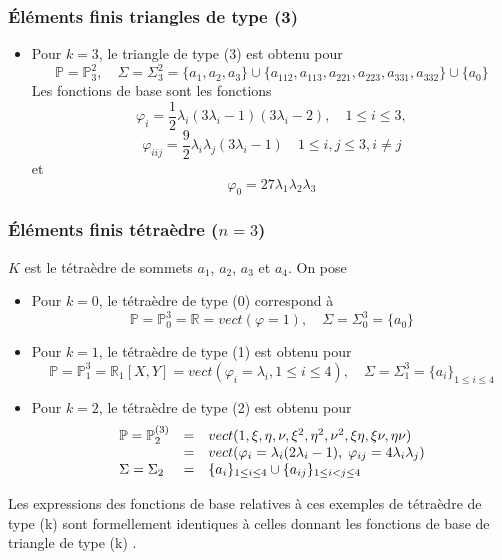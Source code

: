 \documentclass{beamer}
\begin{document}
\begin{frame}
\frametitle{Éléments finis triangles de type (3)}
\begin{itemize}


\item  Pour $k=3$, le triangle de type (3) est obtenu pour
 \[\mathbb{P}=\mathbb{P}_3^2,\quad \Sigma=\Sigma_3^2 = \{a_1,a_2,a_3\}\cup \{a_{112},a_{113},a_{221},a_{223},a_{331},a_{332}\}\cup \{a_{0}\}\]
Les fonctions de base sont les fonctions
\[\varphi_i=\frac 12\lambda_i(3\lambda_i-1)(3\lambda_i-2), \quad 1\leq  i  \leq 3,\] 
\[\varphi_{iij}=\frac 92\lambda_i\lambda_j(3\lambda_i-1) \quad 1\leq  i,j  \leq 3, i\neq j\]
et
  \[\varphi_0 = 27\lambda_1\lambda_2\lambda_3\]
\end{itemize}
\begin{center}
 \end{center}

\end{frame}
\begin{frame}
\frametitle{Éléments finis tétraèdre ($n=3$)}
$K$ est le tétraèdre de sommets $a_1$, $a_2$, $a_3$ et $a_4$. On pose
\begin{itemize}
\item Pour $k=0$, le tétraèdre de type (0) correspond à
\[ \mathbb{P} = \mathbb{P}_0^3=\mathbb{R}=vect(\varphi=1), \quad \Sigma=\Sigma_0^3 = \{a_0\}\]
\item  Pour $k = 1$, le tétraèdre de type (1) est obtenu pour
\[\mathbb{P}=\mathbb{P}_1^3=\mathbb{R}_1[X,Y]=vect(\varphi_i=\lambda_i,1\leq i\leq 4),\quad \Sigma=\Sigma_1^3 = \{a_i\}_{1\leq i\leq 4}\]
\item   Pour $k=2$, le tétraèdre de type (2) est obtenu pour
\[\begin{array}{l  cl}
\mathbb{P}=\mathbb{P}_2^{(3)}&=&vect(1,\xi,\eta,\nu,\xi^2,\eta^2,\nu^2,\xi\eta,\xi\nu,\eta\nu)\\
&=&vect(\varphi_i=\lambda_i(2\lambda_i-1),\; \varphi_{ij}=4\lambda_i\lambda_j)\\
\Sigma=\Sigma_2 &=& \{a_i\}_{1\leq i\leq 4}\cup \{a_{ij}\}_{1\leq i<j\leq 4}
\end{array}
\]
\end{itemize}
Les expressions des fonctions de base relatives à ces exemples de tétraèdre de type (k) sont formellement identiques à celles donnant les fonctions de base de triangle de type (k) .

\end{frame}
\end{document}
